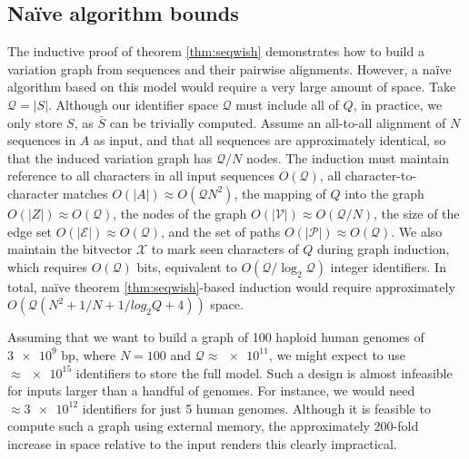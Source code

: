 \documentclass{bioinfo}
\theoremstyle{definition}
\begin{document}

\subsection{Na\"{i}ve algorithm bounds}
\label{sec:bounds}

The inductive proof of theorem \ref{thm:seqwish} demonstrates how to build a variation graph from sequences and their pairwise alignments.
However, a na\"{i}ve algorithm based on this model would require a very large amount of space.
Take $\mathcal{Q} = |S|$.
Although our identifier space $\mathcal{Q}$ must include all of $Q$, in practice, we only store $S$, as $\bar{S}$ can be trivially computed.
Assume an all-to-all alignment of $N$ sequences in $A$ as input, and that all sequences are approximately identical, so that the induced variation graph has $\mathcal{Q}/N$ nodes.
The induction must maintain reference to all characters in all input sequences $O(\mathcal{Q})$, all character-to-character matches $O(|A|) \approx O(\mathcal{Q}N^2)$, the mapping of $Q$ into the graph $O(|Z|) \approx O(\mathcal{Q})$, the nodes of the graph $O(|\mathcal{V}|) \approx O(\mathcal{Q}/N)$, the size of the edge set $O(|\mathcal{E}|) \approx O(\mathcal{Q})$, and the set of paths $O(|\mathcal{P}|) \approx O(\mathcal{Q})$.
We also maintain the bitvector $\mathcal{X}$ to mark seen characters of $Q$ during graph induction, which requires $O(\mathcal{Q})$ bits, equivalent to $O(\mathcal{Q} / \log_2\mathcal{Q})$ integer identifiers.
In total, na\"{i}ve theorem \ref{thm:seqwish}-based induction would require approximately $O(\mathcal{Q}(N^2 + 1/N + 1/log_2{Q} + 4))$ space.

Assuming that we want to build a graph of 100 haploid human genomes of $\num{3e9}$ bp, where $N=100$ and $\mathcal{Q} \approx \num{e11}$, we might expect to use $\approx \num{e15}$ identifiers to store the full model.
Such a design is almost infeasible for inputs larger than a handful of genomes.
For instance, we would need $\approx \num{3e12}$ identifiers for just 5 human genomes.
Although it is feasible to compute such a graph using external memory, the approximately 200-fold increase in space relative to the input renders this clearly impractical.
\end{document}

